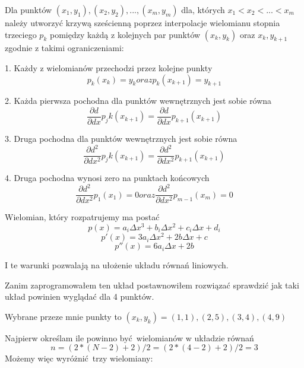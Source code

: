 \documentclass[varwidth,12pt,a4paper]{article}
\begin{document}
Dla punktów $(x_1, y_1), (x_2, y_2), ..., (x_m, y_m)$ dla, których $x_1 < x_2 < ... < x_m $
należy utworzyć krzywą sześcienną poprzez interpolacje wielomianu stopnia trzeciego $p_k$ 
pomiędzy każdą z kolejnych par punktów $(x_k, y_k)$ oraz $x_{k}, y_{k+1}$ zgodnie z takimi ograniczeniami:

1. Każdy z wielomianów przechodzi przez kolejne punkty
\begin{equation}
    p_k (x_k) = y_k oraz p_k (x_{k+1}) = y_{k + 1}
\end{equation}

2. Każda pierwsza pochodna dla punktów wewnętrznych jest sobie równa
\begin{equation}
     \frac{\partial d}{\partial dx} p_jk (x_{k+1}) = \frac{\partial d}{\partial dx} p_{k+1} (x_{k+1})
\end{equation}

3. Druga pochodna dla punktów wewnętrznych jest sobie równa
\begin{equation}
     \frac{\partial d^2}{\partial dx^2} p_jk (x_{k+1}) = \frac{\partial d^2}{\partial dx^2} p_{k+1} (x_{k+1})
\end{equation}

4. Druga pochodna wynosi zero na punktach końcowych
\begin{equation}
     \frac{\partial d^2}{\partial dx^2} p_1 (x_{1}) = 0 oraz \frac{\partial d^2}{\partial dx^2} p_{m-1} (x_{m}) = 0
\end{equation}

Wielomian, który rozpatrujemy ma postać
\begin{equation}
    p(x) = a_i \Delta x^3 + b_i \Delta x^2 + c_i \Delta x + d_i
\end{equation}
\begin{equation}
    p'(x) = 3 a_i \Delta x^2 + 2b \Delta x + c
\end{equation}
\begin{equation}
    p''(x) = 6 a_i \Delta x + 2b
\end{equation}

I te warunki pozwalają na ułożenie układu równań liniowych.

Zanim zaprogramowałem ten układ postawnowiłem rozwiązać sprawdzić jak taki układ powinien wyglądać dla 4 punktów.

Wybrane przeze mnie punkty to $(x_k, y_k)  = (1,1), (2,5), (3,4), (4, 9) $

Najpierw określam ile powinno być wielomianów w układzie równań 
\begin{equation}
n=(2*(N-2)+2)/2 = (2*(4-2)+2)/2 = 3 
\end{equation}
Możemy więc wyróżnić trzy wielomiany:
\end{document}
